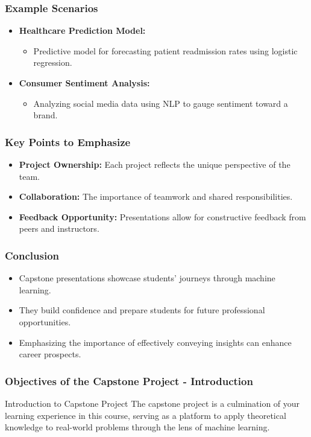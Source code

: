 \documentclass{beamer}
\begin{document}
\begin{frame}[fragile]
    \frametitle{Example Scenarios}
    \begin{itemize}
        \item \textbf{Healthcare Prediction Model:}
            \begin{itemize}
                \item Predictive model for forecasting patient readmission rates using logistic regression.
            \end{itemize}
        \item \textbf{Consumer Sentiment Analysis:}
            \begin{itemize}
                \item Analyzing social media data using NLP to gauge sentiment toward a brand.
            \end{itemize}
    \end{itemize}
\end{frame}

\begin{frame}[fragile]
    \frametitle{Key Points to Emphasize}
    \begin{itemize}
        \item \textbf{Project Ownership:} Each project reflects the unique perspective of the team.
        \item \textbf{Collaboration:} The importance of teamwork and shared responsibilities.
        \item \textbf{Feedback Opportunity:} Presentations allow for constructive feedback from peers and instructors.
    \end{itemize}
\end{frame}

\begin{frame}[fragile]
    \frametitle{Conclusion}
    \begin{itemize}
        \item Capstone presentations showcase students' journeys through machine learning.
        \item They build confidence and prepare students for future professional opportunities.
        \item Emphasizing the importance of effectively conveying insights can enhance career prospects.
    \end{itemize}
\end{frame}

\begin{frame}[fragile]
    \frametitle{Objectives of the Capstone Project - Introduction}
    \begin{block}{Introduction to Capstone Project}
        The capstone project is a culmination of your learning experience in this course, serving as a platform to apply theoretical knowledge to real-world problems through the lens of machine learning.
    \end{block}
\end{frame}
\end{document}
